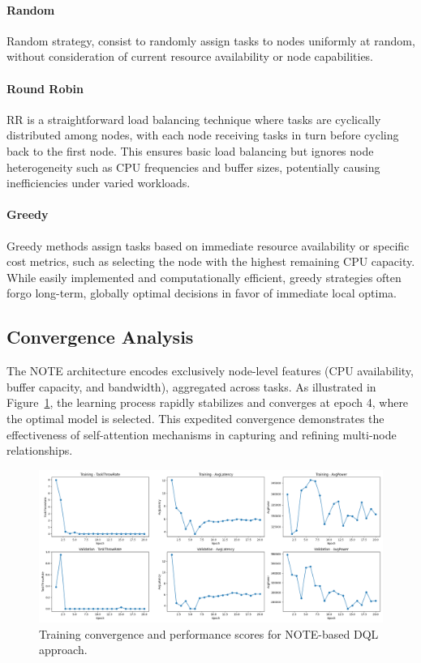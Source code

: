 \documentclass{svproc}
\begin{document}
\paragraph{Random}
Random strategy, consist to randomly assign tasks to nodes uniformly at random, without consideration of current resource availability or node capabilities.

\paragraph{Round Robin}
RR is a straightforward load balancing technique where tasks are cyclically distributed among nodes, with each node receiving tasks in turn before cycling back to the first node. This ensures basic load balancing but ignores node heterogeneity such as CPU frequencies and buffer sizes, potentially causing inefficiencies under varied workloads. 

\paragraph{Greedy}
Greedy methods assign tasks based on immediate resource availability or specific cost metrics, such as selecting the node with the highest remaining CPU capacity. While easily implemented and computationally efficient, greedy strategies often forgo long-term, globally optimal decisions in favor of immediate local optima.




\subsection{Convergence Analysis}

The NOTE architecture encodes exclusively node-level features (CPU availability, buffer capacity, and bandwidth), aggregated across tasks. As illustrated in Figure~\ref{fig:NOTE-score-plot}, the learning process rapidly stabilizes and converges at epoch 4, where the optimal model is selected. This expedited convergence demonstrates the effectiveness of self-attention mechanisms in capturing and refining multi-node relationships.

\begin{figure}[H]
    \centering
    \includegraphics[width=1\linewidth]{figs/NOTE/score_plot.png}
    \caption{Training convergence and performance scores for NOTE-based DQL approach.}
    \label{fig:NOTE-score-plot}
\end{figure}
\end{document}
